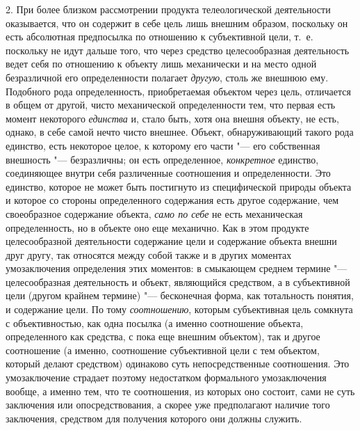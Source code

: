 2. При более близком рассмотрении продукта телеологической
деятельности оказывается, что он содержит в себе цель лишь внешним образом,
поскольку он есть абсолютная предпосылка по отношению к субъективной цели,
т.~е. поскольку не идут дальше того, что через средство целесообразная
деятельность ведет себя по отношению к объекту лишь механически и на место
одной безразличной его определенности полагает {\em другую}, столь же
внешнюю ему. Подобного рода определенность, приобретаемая объектом через
цель, отличается в общем от другой, чисто механической
определенности тем, что первая есть момент некоторого
{\em единства} и, стало
быть, хотя она внешня объекту, не есть, однако, в себе самой нечто чисто
внешнее. Объект, обнаруживающий такого рода единство, есть некоторое целое,
к которому его части "--- его собственная внешность
"--- безразличны; он есть определенное,
{\em конкретное}
единство, соединяющее внутри себя различенные соотношения и
определенности. Это единство, которое не может быть постигнуто из
специфической природы объекта и которое со стороны определенного содержания
есть другое содержание, чем своеобразное содержание объекта,
{\em само по себе} не
есть механическая определенность, но в объекте оно еще механично. Как в
этом продукте целесообразной деятельности содержание цели и содержание
объекта внешни друг другу, так относятся между собой также и в других
моментах умозаключения определения этих моментов: в смыкающем среднем
термине "--- целесообразная деятельность и объект, являющийся
средством, а в субъективной цели (другом крайнем термине)
"--- бесконечная форма, как тотальность понятия, и содержание
цели. По тому {\em соотношению},
которым субъективная цель сомкнута с объективностью, как одна
посылка (а именно соотношение объекта, определенного как средства, с пока
еще внешним объектом), так и другое соотношение (а именно, соотношение
субъективной цели с тем объектом, который делают средством) одинаково суть
непосредственные соотношения. Это умозаключение страдает поэтому
недостатком формального умозаключения вообще, а именно тем, что те
соотношения, из которых оно состоит, сами не суть заключения или
опосредствования, а скорее уже предполагают наличие того заключения,
средством для получения которого они должны служить.


